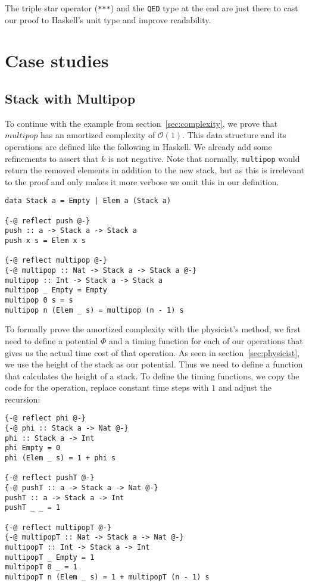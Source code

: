 \documentclass[sigplan,screen]{acmart}
\renewcommand\O[1]{$\mathcal{O}(#1)$}
\begin{document}
The triple star operator (\texttt{***}) and the \texttt{QED} type at the end are just there to cast our proof to Haskell's unit type and improve readability.

\section{Case studies}

\subsection{Stack with Multipop}\label{sec:stack}

To continue with the example from section~\ref{sec:complexity}, we prove that $multipop$ has an amortized complexity of \O{1}. This data structure and its operations are defined like the following in Haskell. We already add some refinements to assert that $k$ is not negative. Note that normally, \texttt{multipop} would return the removed elements in addition to the new stack, but as this is irrelevant to the proof and only makes it more verbose we omit this in our definition.

\begin{lstlisting}
data Stack a = Empty | Elem a (Stack a)

{-@ reflect push @-}
push :: a -> Stack a -> Stack a
push x s = Elem x s

{-@ reflect multipop @-}
{-@ multipop :: Nat -> Stack a -> Stack a @-}
multipop :: Int -> Stack a -> Stack a
multipop _ Empty = Empty
multipop 0 s = s
multipop n (Elem _ s) = multipop (n - 1) s
\end{lstlisting}

To formally prove the amortized complexity with the physicist's method, we first need to define a potential $\Phi$ and a timing function for each of our operations that gives us the actual time cost of that operation. As seen in section~\ref{sec:physicist}, we use the height of the stack as our potential. Thus we need to define a function that calculates the height of a stack. To define the timing functions, we copy the code for the operation, replace constant time steps with $1$ and adjust the recursion:

\begin{lstlisting}
{-@ reflect phi @-}
{-@ phi :: Stack a -> Nat @-}
phi :: Stack a -> Int
phi Empty = 0
phi (Elem _ s) = 1 + phi s

{-@ reflect pushT @-}
{-@ pushT :: a -> Stack a -> Nat @-}
pushT :: a -> Stack a -> Int
pushT _ _ = 1

{-@ reflect multipopT @-}
{-@ multipopT :: Nat -> Stack a -> Nat @-}
multipopT :: Int -> Stack a -> Int
multipopT _ Empty = 1
multipopT 0 _ = 1
multipopT n (Elem _ s) = 1 + multipopT (n - 1) s
\end{lstlisting}
\end{document}
